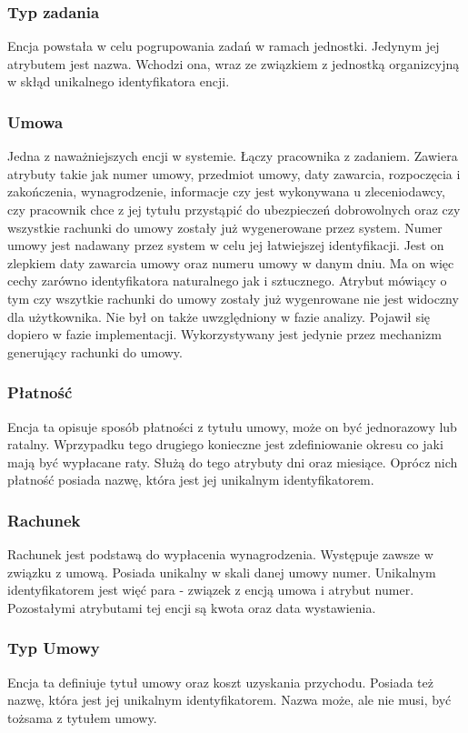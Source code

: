 \subsubsection{Typ zadania}
Encja powstała w celu pogrupowania zadań w ramach jednostki. Jedynym jej atrybutem jest nazwa. Wchodzi ona, wraz ze związkiem z jednostką organizcyjną w skłąd unikalnego identyfikatora encji.

\subsubsection{Umowa}
Jedna z naważniejszych encji w systemie. Łączy pracownika z zadaniem. Zawiera atrybuty takie jak numer umowy, przedmiot umowy, daty zawarcia, rozpoczęcia i zakończenia, wynagrodzenie, informacje czy jest wykonywana u zleceniodawcy, czy pracownik chce z jej tytułu przystąpić do ubezpieczeń dobrowolnych oraz czy wszystkie rachunki do umowy zostały już wygenerowane przez system. Numer umowy jest nadawany przez system w celu jej łatwiejszej identyfikacji. Jest on zlepkiem daty zawarcia umowy oraz numeru umowy w danym dniu. Ma on więc cechy zarówno identyfikatora naturalnego jak i sztucznego. Atrybut mówiący o tym czy wszytkie rachunki do umowy zostały już wygenrowane nie jest widoczny dla użytkownika. Nie był on także uwzględniony w fazie analizy. Pojawił się dopiero w fazie implementacji. Wykorzystywany jest jedynie przez mechanizm generujący rachunki do umowy.

\subsubsection{Płatność}
Encja ta opisuje sposób płatności z tytułu umowy, może on być jednorazowy lub ratalny. Wprzypadku tego drugiego konieczne jest zdefiniowanie okresu co jaki mają być wypłacane raty. Służą do tego atrybuty dni oraz miesiące. Oprócz nich płatność posiada nazwę, która jest jej unikalnym identyfikatorem.

\subsubsection{Rachunek}
Rachunek jest podstawą do wypłacenia wynagrodzenia. Występuje zawsze w związku z umową. Posiada unikalny w skali danej umowy numer. Unikalnym identyfikatorem jest więć para - związek z encją umowa i atrybut numer. Pozostałymi atrybutami tej encji są kwota oraz data wystawienia.

\subsubsection{Typ Umowy}
Encja ta definiuje tytuł umowy oraz koszt uzyskania przychodu. Posiada też nazwę, która jest jej unikalnym identyfikatorem. Nazwa może, ale nie musi, być tożsama z tytułem umowy.

